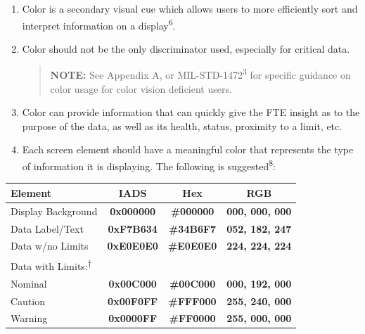 \documentclass[
]{book}
\begin{document}
\begin{enumerate}
\begin{enumerate}
    \begin{enumerate}
    \def\labelenumiii{\arabic{enumiii}.}
    \item
      Color is a secondary visual cue which allows users to more efficiently sort and interpret information on a display\textsuperscript{6}.
    \item
      Color should not be the only discriminator used, especially for critical data.

      \begin{quote}
      \textbf{NOTE:} See Appendix A, or MIL-STD-1472\textsuperscript{3} for specific guidance on color usage for color vision deficient users.
      \end{quote}
    \item
      Color can provide information that can quickly give the FTE insight as to the purpose of the data, as well as its health, status, proximity to a limit, etc.
    \item
      Each screen element should have a meaningful color that represents the type of information it is displaying. The following is suggested\textsuperscript{8}:
    \end{enumerate}

    \begin{longtable}[]{@{}lccc@{}}
    \toprule
    Element & IADS & Hex & RGB\tabularnewline
    \midrule
    \endhead
    Display Background & \textbf{\colorbox[HTML]{FFFFFF}{\textcolor[HTML]{000000}{0x000000}}} & \textbf{\colorbox[HTML]{FFFFFF}{\textcolor[HTML]{000000}{\#000000}}} & \textbf{\colorbox[HTML]{FFFFFF}{\textcolor[HTML]{000000}{000, 000, 000}}}\tabularnewline
    Data Label/Text & \textbf{\colorbox[HTML]{000000}{\textcolor[HTML]{34B6F7}{0xF7B634}}} & \textbf{\colorbox[HTML]{000000}{\textcolor[HTML]{34B6F7}{\#34B6F7}}} & \textbf{\colorbox[HTML]{000000}{\textcolor[HTML]{34B6F7}{052, 182, 247}}}\tabularnewline
    Data w/no Limits & \textbf{\colorbox[HTML]{000000}{\textcolor[HTML]{E0E0E0}{0xE0E0E0}}} & \textbf{\colorbox[HTML]{000000}{\textcolor[HTML]{E0E0E0}{\#E0E0E0}}} & \textbf{\colorbox[HTML]{000000}{\textcolor[HTML]{E0E0E0}{224, 224, 224}}}\tabularnewline
    Data with Limits:\textsuperscript{†} & & &\tabularnewline
    Nominal & \textbf{\colorbox[HTML]{000000}{\textcolor[HTML]{00C000}{0x00C000}}} & \textbf{\colorbox[HTML]{000000}{\textcolor[HTML]{00C000}{\#00C000}}} & \textbf{\colorbox[HTML]{000000}{\textcolor[HTML]{00C000}{000, 192, 000}}}\tabularnewline
    Caution & \textbf{\colorbox[HTML]{000000}{\textcolor[HTML]{FFF000}{0x00F0FF}}} & \textbf{\colorbox[HTML]{000000}{\textcolor[HTML]{FFF000}{\#FFF000}}} & \textbf{\colorbox[HTML]{000000}{\textcolor[HTML]{FFF000}{255, 240, 000}}}\tabularnewline
    Warning & \textbf{\colorbox[HTML]{000000}{\textcolor[HTML]{FF0000}{0x0000FF}}} & \textbf{\colorbox[HTML]{000000}{\textcolor[HTML]{FF0000}{\#FF0000}}} & \textbf{\colorbox[HTML]{000000}{\textcolor[HTML]{FF0000}{255, 000, 000}}}\tabularnewline
    \bottomrule
    \end{longtable}


\end{enumerate}
\end{enumerate}
\end{document}
